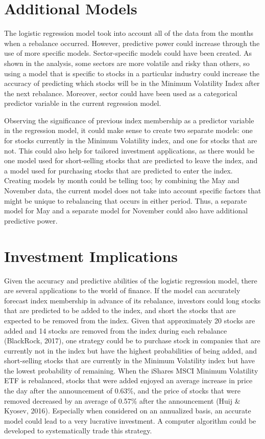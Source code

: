 \documentclass[12pt,twoside]{reedthesis}
\theoremstyle{definition}
\theoremstyle{definition}
\theoremstyle{definition}
\theoremstyle{remark}
\begin{document}
\section{Additional Models}\label{additional-models}

The logistic regression model took into account all of the data from the
months when a rebalance occurred. However, predictive power could
increase through the use of more specific models. Sector-specific models
could have been created. As shown in the analysis, some sectors are more
volatile and risky than others, so using a model that is specific to
stocks in a particular industry could increase the accuracy of
predicting which stocks will be in the Minimum Volatility Index after
the next rebalance. Moreover, sector could have been used as a
categorical predictor variable in the current regression model.

Observing the significance of previous index membership as a predictor
variable in the regression model, it could make sense to create two
separate models: one for stocks currently in the Minimum Volatility
index, and one for stocks that are not. This could also help for
tailored investment applications, as there would be one model used for
short-selling stocks that are predicted to leave the index, and a model
used for purchasing stocks that are predicted to enter the index.
Creating models by month could be telling too; by combining the May and
November data, the current model does not take into account specific
factors that might be unique to rebalancing that occurs in either
period. Thus, a separate model for May and a separate model for November
could also have additional predictive power.

\section{Investment Implications}\label{investment-implications}

Given the accuracy and predictive abilities of the logistic regression
model, there are several applications to the world of finance. If the
model can accurately forecast index membership in advance of its
rebalance, investors could long stocks that are predicted to be added to
the index, and short the stocks that are expected to be removed from the
index. Given that approximately 20 stocks are added and 14 stocks are
removed from the index during each rebalance (BlackRock, 2017), one
strategy could be to purchase stock in companies that are currently not
in the index but have the highest probabilities of being added, and
short-selling stocks that are currently in the Minimum Volatility index
but have the lowest probability of remaining. When the iShares MSCI
Minimum Volatility ETF is rebalanced, stocks that were added enjoyed an
average increase in price the day after the announcement of 0.63\%, and
the price of stocks that were removed decreased by an average of 0.57\%
after the announcement (Huij \& Kyosev, 2016). Especially when
considered on an annualized basis, an accurate model could lead to a
very lucrative investment. A computer algorithm could be developed to
systematically trade this strategy.
\end{document}
